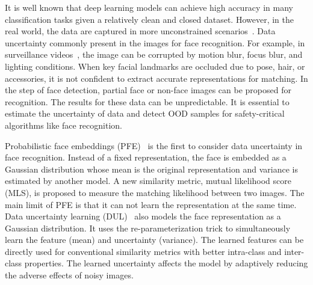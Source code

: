 \documentclass[letterpaper]{article} %
\begin{document}
It is well known that deep learning models can achieve high accuracy in many classification tasks given a relatively clean and closed dataset. 
%
However, in the real world, the data are captured in more unconstrained scenarios~\cite{shi2016deep,wang2020suppressing}. Data uncertainty commonly present in the images for face recognition. For example, in surveillance videos~\cite{kalka2018ijb,maze2018iarpa,klare2015pushing}, the image can be corrupted by motion blur, focus blur, and lighting conditions. When key facial landmarks are occluded due to pose, hair, or accessories, it is not confident to extract accurate representations for matching. In the step of face detection, partial face or non-face images can be proposed for recognition. The results for these data can be unpredictable. 
%
It is essential to estimate the uncertainty of data and detect OOD samples for safety-critical algorithms like face recognition.

Probabilistic face embeddings (PFE)~\cite{shi2019probabilistic} is the first to consider data uncertainty in face recognition. Instead of a fixed representation, the face is embedded as a Gaussian distribution whose mean is the original representation and variance is estimated by another model. A new similarity metric, mutual likelihood score (MLS), is proposed to measure the matching likelihood between two images. 
%
The main limit of PFE is that it can not learn the representation at the same time. 
%
Data uncertainty learning (DUL)~\cite{chang2020data} also models the face representation as a Gaussian distribution. It uses the re-parameterization trick to simultaneously learn the feature (mean) and uncertainty (variance). The learned features can be directly used for conventional similarity metrics with better intra-class and inter-class properties. The learned uncertainty affects the model by adaptively reducing the adverse effects of noisy images.
\end{document}

